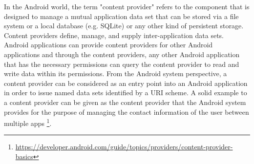 In the Android world, the term "content provider" refers to the component that is designed to manage a mutual application data set that can be stored via a file system or a local database (e.g. SQLite) or any other kind of persistent storage. Content providers define, manage, and supply inter-application data sets. Android applications can provide content providers for other Android applications and through the content providers, any other Android application that has the necessary permissions can query the content provider to read and write data within its permissions. From the Android system perspective, a content provider can be considered as an entry point into an Android application in order to issue named data sets identified by a URI scheme. A solid example to a content provider can be given as the content provider that the Android system provides for the purpose of managing the contact information of the user between multiple apps \footnote{\url{https://developer.android.com/guide/topics/providers/content-provider-basics}}.

